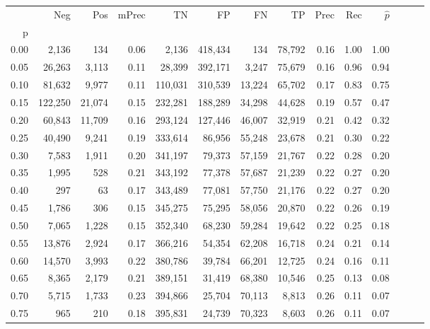 \begin{tabular}{rrrrrrrrrrrrrr}
\toprule
{} &      Neg &     Pos & mPrec &       TN &       FP &      FN &      TP &  Prec &   Rec & $\hat{p}$ \\
p    &          &         &       &          &          &         &         &       &       &           \\
\midrule
0.00 &    2,136 &     134 &  0.06 &    2,136 &  418,434 &     134 &  78,792 &  0.16 &  1.00 &      1.00 \\
0.05 &   26,263 &   3,113 &  0.11 &   28,399 &  392,171 &   3,247 &  75,679 &  0.16 &  0.96 &      0.94 \\
0.10 &   81,632 &   9,977 &  0.11 &  110,031 &  310,539 &  13,224 &  65,702 &  0.17 &  0.83 &      0.75 \\
0.15 &  122,250 &  21,074 &  0.15 &  232,281 &  188,289 &  34,298 &  44,628 &  0.19 &  0.57 &      0.47 \\
0.20 &   60,843 &  11,709 &  0.16 &  293,124 &  127,446 &  46,007 &  32,919 &  0.21 &  0.42 &      0.32 \\
0.25 &   40,490 &   9,241 &  0.19 &  333,614 &   86,956 &  55,248 &  23,678 &  0.21 &  0.30 &      0.22 \\
0.30 &    7,583 &   1,911 &  0.20 &  341,197 &   79,373 &  57,159 &  21,767 &  0.22 &  0.28 &      0.20 \\
0.35 &    1,995 &     528 &  0.21 &  343,192 &   77,378 &  57,687 &  21,239 &  0.22 &  0.27 &      0.20 \\
0.40 &      297 &      63 &  0.17 &  343,489 &   77,081 &  57,750 &  21,176 &  0.22 &  0.27 &      0.20 \\
0.45 &    1,786 &     306 &  0.15 &  345,275 &   75,295 &  58,056 &  20,870 &  0.22 &  0.26 &      0.19 \\
0.50 &    7,065 &   1,228 &  0.15 &  352,340 &   68,230 &  59,284 &  19,642 &  0.22 &  0.25 &      0.18 \\
0.55 &   13,876 &   2,924 &  0.17 &  366,216 &   54,354 &  62,208 &  16,718 &  0.24 &  0.21 &      0.14 \\
0.60 &   14,570 &   3,993 &  0.22 &  380,786 &   39,784 &  66,201 &  12,725 &  0.24 &  0.16 &      0.11 \\
0.65 &    8,365 &   2,179 &  0.21 &  389,151 &   31,419 &  68,380 &  10,546 &  0.25 &  0.13 &      0.08 \\
0.70 &    5,715 &   1,733 &  0.23 &  394,866 &   25,704 &  70,113 &   8,813 &  0.26 &  0.11 &      0.07 \\
0.75 &      965 &     210 &  0.18 &  395,831 &   24,739 &  70,323 &   8,603 &  0.26 &  0.11 &      0.07 \\

\end{tabular}
